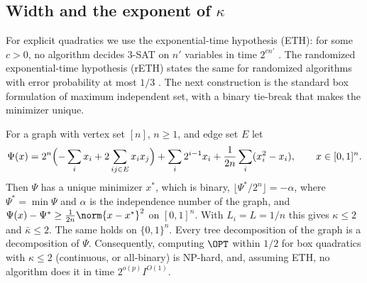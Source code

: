 \subsection{Width and the exponent of \texorpdfstring{$\kappa$}{kappa}}\label{sec:limits-width}

For explicit quadratics we use the exponential-time hypothesis (ETH): for some
$c>0$, no algorithm decides 3-SAT on $n'$ variables in time $2^{cn'}$
\cite{ImpagliazzoPaturiZane2001}. The randomized exponential-time hypothesis
(rETH) states the same for randomized algorithms with error probability at
most $1/3$ \cite{DellEtAl2014}. The next construction is the standard box
formulation of maximum independent set, with a binary tie-break that makes
the minimizer unique.

\begin{proposition}
\label{prop:lbwidth}
For a graph with vertex set $[n]$, $n\ge1$, and edge set $E$ let
\[
\Psi(x)=2^n\Bigl(-\sum_ix_i+2\sum_{ij\in E}x_ix_j\Bigr)+\sum_i2^{i-1}x_i
+\frac1{2n}\sum_i(x_i^2-x_i),\qquad x\in[0,1]^n .
\]
Then $\Psi$ has a unique minimizer $x^*$, which is binary,
$\lfloor\Psi^*/2^n\rfloor=-\alpha$, where $\Psi^*=\min\Psi$ and $\alpha$ is
the independence number of the graph, and
$\Psi(x)-\Psi^*\ge\frac1{2n}\norm{x-x^*}^2$ on $[0,1]^n$. With $L_i=L=1/n$
this gives $\kappa\le2$ and $\bar\kappa\le2$. The same holds on
$\{0,1\}^n$. Every tree decomposition of the graph is a decomposition of
$\Psi$. Consequently, computing $\OPT$ within $1/2$ for box quadratics with
$\kappa\le2$ (continuous, or all-binary) is NP-hard, and, assuming ETH, no
algorithm does it in time $2^{o(p)}I^{O(1)}$.
\end{proposition}

